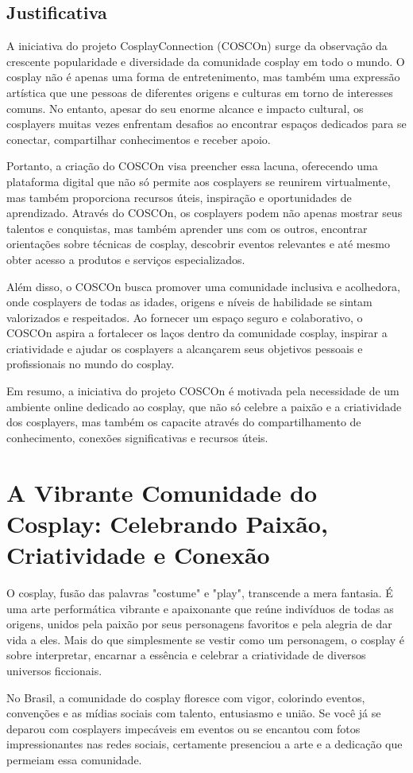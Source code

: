 \documentclass[12pt,a4paper,chapter=TITLE,section=TITLE,subsection=TITLE,subsubsection=TITLE]{article}
\begin{document}
\subsection{Justificativa}    

A iniciativa do projeto CosplayConnection (COSCOn) surge da observação da crescente popularidade e diversidade da comunidade cosplay em todo o mundo. O cosplay não é apenas uma forma de entretenimento, mas também uma expressão artística que une pessoas de diferentes origens e culturas em torno de interesses comuns. No entanto, apesar do seu enorme alcance e impacto cultural, os cosplayers muitas vezes enfrentam desafios ao encontrar espaços dedicados para se conectar, compartilhar conhecimentos e receber apoio.

Portanto, a criação do COSCOn visa preencher essa lacuna, oferecendo uma plataforma digital que não só permite aos cosplayers se reunirem virtualmente, mas também proporciona recursos úteis, inspiração e oportunidades de aprendizado. Através do COSCOn, os cosplayers podem não apenas mostrar seus talentos e conquistas, mas também aprender uns com os outros, encontrar orientações sobre técnicas de cosplay, descobrir eventos relevantes e até mesmo obter acesso a produtos e serviços especializados.

Além disso, o COSCOn busca promover uma comunidade inclusiva e acolhedora, onde cosplayers de todas as idades, origens e níveis de habilidade se sintam valorizados e respeitados. Ao fornecer um espaço seguro e colaborativo, o COSCOn aspira a fortalecer os laços dentro da comunidade cosplay, inspirar a criatividade e ajudar os cosplayers a alcançarem seus objetivos pessoais e profissionais no mundo do cosplay.

Em resumo, a iniciativa do projeto COSCOn é motivada pela necessidade de um ambiente online dedicado ao cosplay, que não só celebre a paixão e a criatividade dos cosplayers, mas também os capacite através do compartilhamento de conhecimento, conexões significativas e recursos úteis.




\section{A Vibrante Comunidade do Cosplay: Celebrando Paixão, Criatividade e Conexão}


    \begin{citacao}
  O cosplay, fusão das palavras "costume" e "play", transcende a mera fantasia. É uma arte performática vibrante e apaixonante que reúne indivíduos de todas as origens, unidos pela paixão por seus personagens favoritos e pela alegria de dar vida a eles. Mais do que simplesmente se vestir como um personagem, o cosplay é sobre interpretar, encarnar a essência e celebrar a criatividade de diversos universos ficcionais.

No Brasil, a comunidade do cosplay floresce com vigor, colorindo eventos, convenções e as mídias sociais com talento, entusiasmo e união. Se você já se deparou com cosplayers impecáveis em eventos ou se encantou com fotos impressionantes nas redes sociais, certamente presenciou a arte e a dedicação que permeiam essa comunidade.
    \end{citacao}
\end{document}
